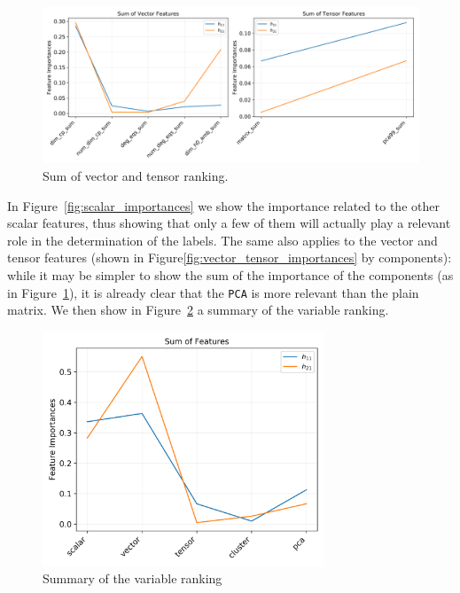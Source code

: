     \begin{figure}[!t]
        \centering
        \includegraphics[width=\textwidth]{tex/img/feature_importances_vector_tensor_sum.png}
        \caption{Sum of vector and tensor ranking.}
        \label{fig:vector_tensor_sum_importances}
    \end{figure}
    
    In Figure~\ref{fig:scalar_importances} we show the importance related to the other scalar features, thus showing that only a few of them will actually play a relevant role in the determination of the labels. The same also applies to the vector and tensor features (shown in Figure\ref{fig:vector_tensor_importances} by components): while it may be simpler to show the sum of the importance of the components (as in Figure~\ref{fig:vector_tensor_sum_importances}), it is already clear that the \texttt{PCA} is more relevant than the plain matrix. We then show in Figure~\ref{fig:summary_importances} a summary of the variable ranking.
    
    \begin{figure}[!t]
        \centering
        \includegraphics[width=0.75\textwidth]{tex/img/feature_importances_sum.png}
        \caption{Summary of the variable ranking}
        \label{fig:summary_importances}
    \end{figure}
    
